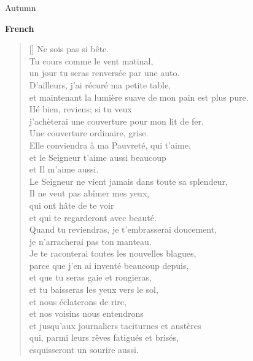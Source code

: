 \documentclass[a4paper,12pt,twoside,final]{book}
\begin{document}
Autumn

\newpage

\noindent \textbf{French}


\settowidth{\versewidth}{et maintenant la lumière tendre de mon pain est plus pure.}

\begin{verse}[\versewidth]
  Ne sois pas si bête. \\
  Tu cours comme le vent matinal, \\
  un jour tu seras renversée par une auto. \\
  D'ailleurs, j'ai récuré ma petite table, \\
  et maintenant la lumière suave de mon pain est plus pure. \\
  Hé bien, reviens; si tu veux \\
  j'achèterai une couverture pour mon lit de fer. \\
  Une couverture ordinaire, grise. \\
  Elle conviendra à ma Pauvreté, qui t'aime, \\
  et le Seigneur t'aime aussi beaucoup \\
  et Il m'aime aussi. \\
  Le Seigneur ne vient jamais dans toute sa splendeur, \\
  Il ne veut pas abîmer mes yeux, \\
  qui ont hâte de te voir \\
  et qui te regarderont avec beauté. \\
  Quand tu reviendras, je t'embrasserai doucement, \\
  je n'arracherai pas ton manteau. \\
  Je te raconterai toutes les nouvelles blagues, \\
  parce que j'en ai inventé beaucoup depuis, \\
  et que tu seras gaie et rougieras, \\
  et tu baisseras les yeux vers le sol, \\
  et nous éclaterons de rire, \\
  et nos voisins nous entendrons \\
  et jusqu'aux journaliers taciturnes et austères \\
  qui, parmi leurs rêves fatigués et brisés, \\
  esquisseront un sourire aussi. \\
\end{verse}
\end{document}

